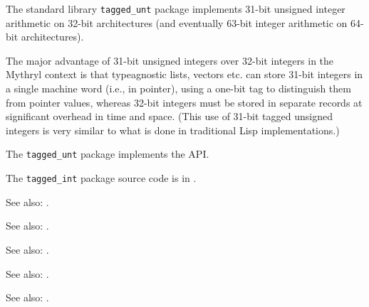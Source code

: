 
The standard library {\tt tagged\_unt} package implements 31-bit unsigned integer arithmetic 
on 32-bit architectures (and eventually 63-bit integer arithmetic on 64-bit architectures).

The major advantage of 31-bit unsigned integers over 32-bit integers in the Mythryl 
context is that typeagnostic lists, vectors etc. can store 31-bit 
integers in a single machine word (i.e., in pointer), using a one-bit tag 
to distinguish them from pointer values, whereas 32-bit integers must be 
stored in separate records at significant overhead in time and space. 
(This use of 31-bit tagged unsigned integers is very similar to what is done in 
traditional Lisp implementations.)

The {\tt tagged\_unt} package implements the  API.

The {\tt tagged\_int} package source code is in .

See also:  .

See also:  .

See also:  .

See also:  .

See also:  .
